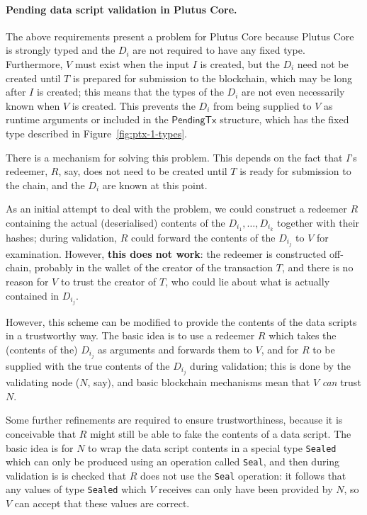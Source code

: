 \documentclass[a4paper]{article}
\newcommand{\s}{\textsf}  %
\newcommand{\ptx}{\ensuremath{\s{PendingTx}}}
\begin{document}
\paragraph{Pending data script validation in Plutus Core.} The above
requirements present a problem for Plutus Core because Plutus Core is
strongly typed and the $D_i$ are not required to have any fixed type.
Furthermore, $V$ must exist when the input $I$ is created, but the
$D_i$ need not be created until $T$ is prepared for submission to the
blockchain, which may be long after $I$ is created; this means that
the types of the $D_i$ are not even necessarily known when $V$ is
created.  This prevents the $D_i$ from being supplied to $V$ as
runtime arguments or included in the $\ptx$ structure, which has the
fixed type described in Figure~\ref{fig:ptx-1-types}.

There is a mechanism for solving this problem.  This depends on the
fact that $I$'s redeemer, $R$, say, does not need to be
created until $T$ is ready for submission to the chain, and the $D_i$
are known at this point.

As an initial attempt to deal with the problem, we could construct a
redeemer $R$ containing the actual (deserialised) contents of
the $D_{i_1},\ldots,D_{i_k}$ together with their hashes; during validation,
$R$ could forward the contents of the $D_{i_j}$ to $V$ for examination.
However, \textbf{this does not work}: the redeemer is constructed
off-chain, probably in the wallet of the creator of the transaction
$T$, and there is no reason for $V$ to trust the creator of $T$,
who could lie about what is actually contained in $D_{i_j}$.

However, this scheme can be modified to provide the contents of the
data scripts in a trustworthy way.  The basic idea is to use a
redeemer $R$ which takes the (contents of the) $D_{i_j}$ as arguments and
forwards them to $V$, and for $R$ to be supplied with the true
contents of the $D_{i_j}$ during validation; this is done by the
validating node ($N$, say), and basic blockchain mechanisms mean that
$V$ \textit{can} trust $N$.

Some further refinements are required to ensure trustworthiness,
because it is conceivable that $R$ might still be able to fake the
contents of a data script.  The basic idea is for $N$ to wrap the data
script contents in a special type \verb|Sealed| which can only be
produced using an operation called \verb|Seal|, and then during
validation is is checked that $R$ does not use the \verb|Seal|
operation: it follows that any values of type \verb|Sealed| which
$V$ receives can only have been provided by $N$, so $V$ can accept
that these values are correct.
\end{document}
